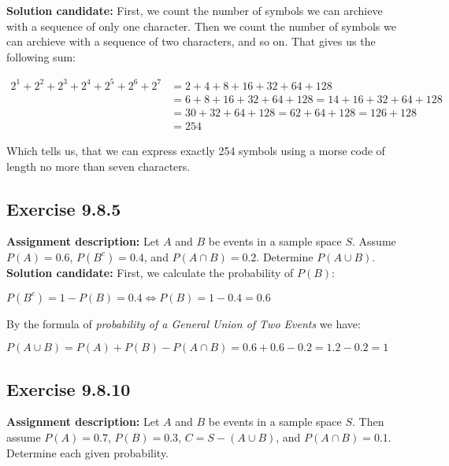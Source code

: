 \documentclass{report}
\newcommand{\cent}[1]{\begin{center}#1\end{center}}
\newcommand{\mAlign}[1]{\begin{align*}#1\end{align*}}
\newcommand{\AssignmentDescription}{\textbf{Assignment description: }}
\newcommand{\Solution}{\textbf{Solution candidate: }}
\newcommand{\QED}{\boxed{}}
\newcommand{\Exercise}[1]{\subsection{Exercise #1}}
\begin{document}
 	\Solution
 	First, we count the number of symbols we can archieve with a sequence of only one character. Then we count the number of symbols we can archieve with a sequence of two characters, and so on. That gives us the following sum:
 	
 	\mAlign{
 		2^1 + 2^2 + 2^3 + 2^4 + 2^5 + 2^6 + 2^7 &= 2 + 4 +8 +16 +32 + 64 +128 \\
 		&= 6+8+16+32+64+128 = 14+16+32+64+128 \\ 
 		&= 30 +32+ 64 + 128 = 62+64 +128 = 126+128 \\
 		&= 254
 	}
 	
 	Which tells us, that we can express exactly 254 symbols using a morse code of length no more than seven characters.
 	
 	\Exercise{9.8.5}
 	\AssignmentDescription
 	Let $A$ and $B$ be events in a sample space $S$. Assume $P(A) = 0.6$, $P(B^c) = 0.4$, and $P(A \cap B) = 0.2$. Determine $P(A \cup B)$.\\
 	
 	\Solution
 	First, we calculate the probability of $P(B)$:
 	
 	\cent{$P(B^c) = 1 - P( B) = 0.4 \Leftrightarrow P(B) = 1 - 0.4 = 0.6$}
 	
 	By the formula of \textit{probability of a General Union of Two Events} we have:
 	
 	\cent{$P(A \cup B) = P(A) + P(B) - P(A \cap B) = 0.6 + 0.6 - 0.2 = 1.2 - 0.2 = 1$}
 	
 	\QED
 	
 	\Exercise{9.8.10}
 	\AssignmentDescription
 	Let $A$ and $B$ be events in a sample space $S$. Then assume $P(A) = 0.7$, $P(B) = 0.3$, $C = S - (A \cup B)$, and $P(A \cap B) = 0.1$. Determine each given probability.\\
 	 	
\end{document}
